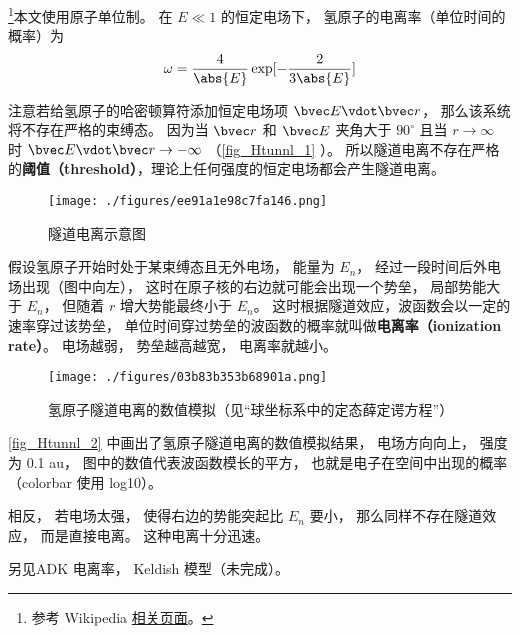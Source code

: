 

\footnote{参考 Wikipedia \href{https://en.wikipedia.org/wiki/Tunnel_ionization}{相关页面}。}本文使用原子单位制。 在 $E \ll 1$ 的恒定电场下， 氢原子的电离率（单位时间的概率）为
\begin{equation}
\omega = \frac{4}{\abs{E}} \exp[-\frac{2}{3\abs{E}}]
\end{equation}

注意若给氢原子的哈密顿算符添加恒定电场项 $\bvec E \vdot \bvec r$， 那么该系统将不存在严格的束缚态。 因为当 $\bvec r$ 和 $\bvec E$ 夹角大于 $90^\circ$ 且当 $r\to\infty$ 时 $\bvec E \vdot \bvec r \to -\infty$ （\autoref{fig_Htunnl_1} ）。 所以隧道电离不存在严格的\textbf{阈值（threshold）}，理论上任何强度的恒定电场都会产生隧道电离。

\begin{figure}[ht]
\centering
\texttt{[image: ./figures/ee91a1e98c7fa146.png]}
\caption{隧道电离示意图} \label{fig_Htunnl_1}
\end{figure}

假设氢原子开始时处于某束缚态且无外电场， 能量为 $E_n$， 经过一段时间后外电场出现（图中向左）， 这时在原子核的右边就可能会出现一个势垒， 局部势能大于 $E_n$， 但随着 $r$ 增大势能最终小于 $E_n$。 这时根据隧道效应，波函数会以一定的速率穿过该势垒， 单位时间穿过势垒的波函数的概率就叫做\textbf{电离率（ionization rate）}。 电场越弱， 势垒越高越宽， 电离率就越小。

\begin{figure}[ht]
\centering
\texttt{[image: ./figures/03b83b353b68901a.png]}
\caption{氢原子隧道电离的数值模拟（见“球坐标系中的定态薛定谔方程”）} \label{fig_Htunnl_2}
\end{figure}
\autoref{fig_Htunnl_2} 中画出了氢原子隧道电离的数值模拟结果， 电场方向向上， 强度为 0.1 au， 图中的数值代表波函数模长的平方， 也就是电子在空间中出现的概率（colorbar 使用 log10）。

相反， 若电场太强， 使得右边的势能突起比 $E_n$ 要小， 那么同样不存在隧道效应， 而是直接电离。 这种电离十分迅速。

另见ADK 电离率， Keldish 模型（未完成）。
